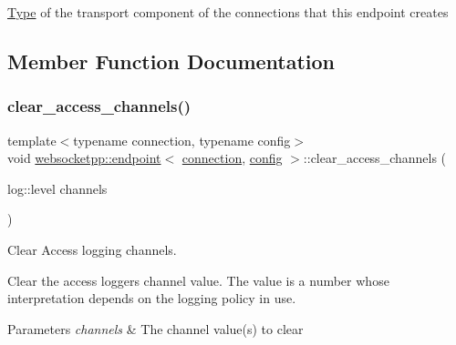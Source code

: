 \mbox{\hyperlink{struct_type}{Type}} of the transport component of the connections that this endpoint creates 

\subsection{Member Function Documentation}
\mbox{\label{classwebsocketpp_1_1endpoint_a3fe357b3c6434273a9965eb52902575d}} 
\subsubsection{\texorpdfstring{clear\+\_\+access\+\_\+channels()}{clear\_access\_channels()}}
{\footnotesize\ttfamily template$<$typename connection, typename config$>$ \\
void \mbox{\hyperlink{classwebsocketpp_1_1endpoint}{websocketpp\+::endpoint}}$<$ \mbox{\hyperlink{classwebsocketpp_1_1connection}{connection}}, \mbox{\hyperlink{classconfig}{config}} $>$\+::clear\+\_\+access\+\_\+channels (\begin{DoxyParamCaption}\item[{log\+::level}]{channels }\end{DoxyParamCaption})\hspace{0.3cm}{\ttfamily [inline]}}



Clear Access logging channels. 

Clear the access logger\textquotesingle{}s channel value. The value is a number whose interpretation depends on the logging policy in use.


\begin{DoxyParams}{Parameters}
{\em channels} & The channel value(s) to clear \\
\hline
\end{DoxyParams}
\mbox{\label{classwebsocketpp_1_1endpoint_a8cefa4fc37c0df4eb6ed0bcf04bb0da5}} 
